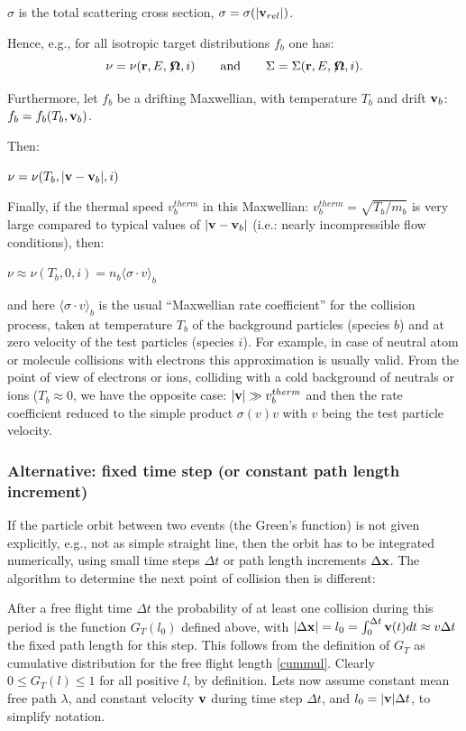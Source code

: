 $\sigma$ is the total scattering cross section, $\sigma = \sigma(|\mathbf{v}_{rel}|)$.

Hence, e.g., for all isotropic target distributions $f_b$ one has:
\begin{displaymath}
  \nu = \nu(\mathbf{r},E,\not\! \mathbf{\Omega},i) \qquad
  \mbox{and} \qquad \Sigma = \Sigma(\mathbf{r},E,\not\!\mathbf{\Omega},i).
\end{displaymath}

Furthermore, let $f_b$ be a drifting Maxwellian, with temperature $T_b$ and
drift $\mathbf{v}_b$: $f_b = f_b(T_b,\mathbf{v}_b)$.

Then:

$\nu = \nu(T_b,|\mathbf{v}-\mathbf{v}_b|,i)$ 

Finally, if the thermal speed $v_b^{therm}$ in this Maxwellian:
$v_b^{therm} = \sqrt{T_b/m_b}$ is very large compared to typical values of
$|\mathbf{v}-\mathbf{v}_b|$ (i.e.: nearly incompressible flow conditions), then:

$\nu \approx \nu(T_b,0,i) = n_b \langle\sigma \cdot v\rangle_b$

and here $\langle\sigma \cdot v\rangle_b$ is the usual ``Maxwellian rate
coefficient'' for the collision process, taken at temperature $T_b$ of the
background particles (species $b$) and at zero velocity of the test particles
(species $i$).
For example, in case of neutral atom or molecule collisions with electrons this
approximation is usually valid.
From the point of view of electrons or ions, colliding with a cold background
of neutrals or ions ($T_b\approx 0$, we have the opposite case: $|\mathbf{v}|\gg
  v_b^{therm}$ and then the rate coefficient reduced to the simple product
$\sigma(v) v$ with $v$ being the test particle velocity.

\subsubsection{Alternative: fixed time step (or constant path length increment)}

If the particle orbit between two events (the Green's function) is not given
explicitly, e.g., not as simple straight line, then the orbit has to be
integrated numerically, using small time steps $\Delta t$ or path length
increments $\Delta \mathbf{x}$.
The algorithm to determine the next point of collision then is different:

After a free flight  time  $\Delta t$ the probability of at least one collision
during this period is the function $G_T(l_0)$ defined above, with $|\Delta \mathbf{x}|
  = l_0 = \int_0^{\Delta t} \mathbf{v}(t) dt \approx v \Delta t$ the fixed path length
for this step.
This follows from the definition of $G_T$ as cumulative distribution for the
free flight length \cref{cummul}.
Clearly $0\le G_T(l) \le 1$ for all positive $l$, by definition.
Lets now assume constant mean free path $\lambda$, and constant velocity $\mathbf{v}$
during time step $\Delta t$, and $l_0=|\mathbf{v}| \Delta t$, to simplify notation.

